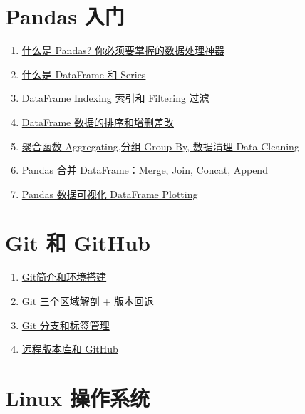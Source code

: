 \documentclass[11pt]{article}
\begin{document}
\vspace{0.5cm}

\section{\kaishu Pandas 入门}

\begin{enumerate}
	\item \href{https://mp.weixin.qq.com/s/cAhJC__CLMkTKukjhV2e9w}{什么是 Pandas? 你必须要掌握的数据处理神器} %
	\item \href{https://mp.weixin.qq.com/s/AUqF4K2-DnoHIuUKwBAMNw}{什么是 DataFrame 和 Series} %
	\item \href{https://mp.weixin.qq.com/s/-1XpxKpDsNui5vDGW47ldg}{DataFrame Indexing 索引和 Filtering 过滤} %
	\item \href{https://mp.weixin.qq.com/s/NaLsGPjCNUFp1a6xhVk9XA}{DataFrame 数据的排序和增删差改} %
	\item \href{https://mp.weixin.qq.com/s/7zZRduHEK264bC6kto0Nig}{聚合函数 Aggregating,分组 Group By, 数据清理 Data Cleaning} %
	\item \href{https://mp.weixin.qq.com/s/RW_g1kNefW7aZpWybxI9qA}{Pandas 合并 DataFrame：Merge, Join, Concat, Append} %
	\item \href{https://mp.weixin.qq.com/s/hscltT10gLiw0Bh_105xpw}{Pandas 数据可视化 DataFrame Plotting} %
\end{enumerate}

\newpage 

\section{\kaishu Git 和 GitHub}

\begin{enumerate}
	\item \href{https://mp.weixin.qq.com/s/flJMzIpooB4U1pRy1PRqAg}{Git简介和环境搭建} %
	\item \href{https://mp.weixin.qq.com/s/dYrjC6_NwX5PKMAPkijMYg}{Git 三个区域解剖 + 版本回退} %
	\item \href{https://mp.weixin.qq.com/s/_rYCaK6gQrHFje2UsozFRQ}{Git 分支和标签管理} %
	\item \href{https://mp.weixin.qq.com/s/rCc3JQD_ir0Wo6KxheNTVA}{远程版本库和 GitHub} %
\end{enumerate}

\vspace{0.5cm}

\section{\kaishu Linux 操作系统}
\end{document}
